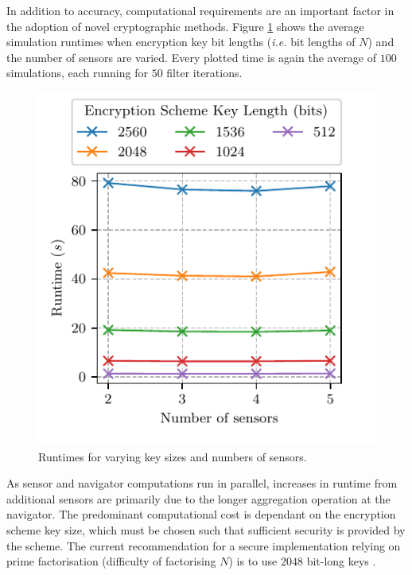 \documentclass[10pt,journal,compsoc]{IEEEtran}
\theoremstyle{definition}
\theoremstyle{definition}
\theoremstyle{remark}
\begin{document}
In addition to accuracy, computational requirements are an important factor in the adoption of novel cryptographic methods. Figure \ref{fig:sim_timing} shows the average simulation runtimes when encryption key bit lengths (\textit{i.e.} bit lengths of $N$) and the number of sensors are varied. Every plotted time is again the average of $100$ simulations, each running for $50$ filter iterations. 
\begin{figure}[htbp]
\centering
\includegraphics{images/timing.pdf}
\caption{Runtimes for varying key sizes and numbers of sensors.}
\label{fig:sim_timing}
\end{figure}
As sensor and navigator computations run in parallel, increases in runtime from additional sensors are primarily due to the longer aggregation operation at the navigator. The predominant computational cost is dependant on the encryption scheme key size, which must be chosen such that sufficient security is provided by the scheme. The current recommendation for a secure implementation relying on prime factorisation (difficulty of factorising $N$) is to use $2048$ bit-long keys \cite{barkerRecommendationPairwiseKey2019}.

% 
%                                               
%                                               
%                                               
% 
\end{document}
